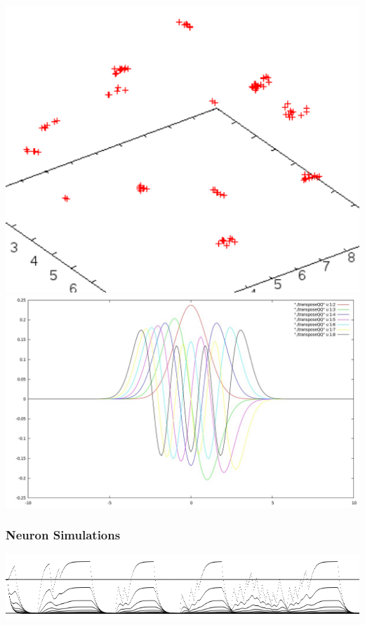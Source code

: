\documentclass[../resume.tex]{subfiles}
\begin{document}
\noindent
\includegraphics[scale=0.3]{../scientific/mdpos.png} 
\includegraphics[scale=0.15]{../scientific/quantumHO.png} 


\newpage
\subsubsection{Neuron Simulations}
\includegraphics[scale=0.5]{../scientific/potential.png}
\end{document}
